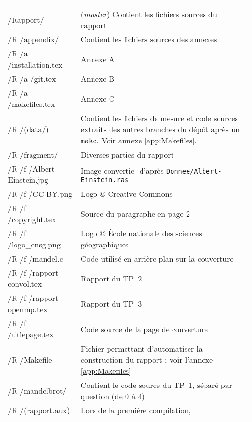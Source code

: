 \begin{onecolumn}
\begin{longtable}{>{\ttfamily}m{} p{}}
                               & \\
    /Rapport/                  & (\emph{master}) Contient les fichiers
                                 sources du rapport\\
    /R /appendix/              & Contient les fichiers sources des
                                 annexes\\
    /R /a /installation.tex    & Annexe A\\
    /R /a /git.tex             & Annexe B\\
    /R /a /makefiles.tex       & Annexe C\\
    /R /(data/)                & Contient les fichiers de mesure et
                                 code sources extraits des autres
                                 branches du dépôt après un
                                 \texttt{make}. Voir annexe
                                 \ref{app:Makefiles}.\\
    /R /fragment/              & Diverses parties du rapport\\
    /R /f /Albert-Einstein.jpg & Image\,\,convertie\,\,%
                                 d'après
                                 \texttt{Donnee/Albert-Einstein.ras}\\
    /R /f /CC-BY.png           & Logo © Creative Commons\\
    /R /f /copyright.tex       & Source du paragraphe en page 2\\
    /R /f /logo\_ensg.png      & Logo © École nationale des sciences
                                 géographiques\\
    /R /f /mandel.c            & Code utilisé en arrière-plan sur la
                                 couverture\\
    /R /f /rapport-convol.tex  & Rapport du TP~2\\
    /R /f /rapport-openmp.tex  & Rapport du TP~3\\
    /R /f /titlepage.tex       & Code source de la page de
                                 couverture\\
    /R /Makefile               & Fichier permettant d'automatiser la
                                 construction du rapport ; voir
                                 l'annexe \ref{app:Makefiles}\\
    /R /mandelbrot/            & Contient le code source du TP~1,
                                 séparé par question (de 0 à 4)\\
    /R /(rapport.aux)          & Lors de la première compilation,

\end{longtable}
\end{onecolumn}
